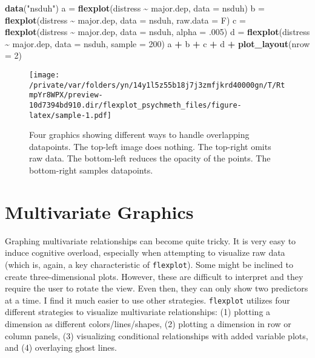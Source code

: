 \documentclass[
  english,
  man]{apa6}
\newenvironment{Shaded}{\begin{snugshade}}{\end{snugshade}}
\newcommand{\DataTypeTok}[1]{\textcolor[rgb]{0.13,0.29,0.53}{#1}}
\newcommand{\DecValTok}[1]{\textcolor[rgb]{0.00,0.00,0.81}{#1}}
\newcommand{\FloatTok}[1]{\textcolor[rgb]{0.00,0.00,0.81}{#1}}
\newcommand{\KeywordTok}[1]{\textcolor[rgb]{0.13,0.29,0.53}{\textbf{#1}}}
\newcommand{\NormalTok}[1]{#1}
\newcommand{\OperatorTok}[1]{\textcolor[rgb]{0.81,0.36,0.00}{\textbf{#1}}}
\newcommand{\StringTok}[1]{\textcolor[rgb]{0.31,0.60,0.02}{#1}}
\begin{document}
\small

\begin{Shaded}
\begin{Highlighting}[]
\KeywordTok{data}\NormalTok{(}\StringTok{"nsduh"}\NormalTok{)}
\NormalTok{a =}\StringTok{ }\KeywordTok{flexplot}\NormalTok{(distress }\OperatorTok{\textasciitilde{}}\StringTok{ }\NormalTok{major.dep, }\DataTypeTok{data =}\NormalTok{ nsduh)}
\NormalTok{b =}\StringTok{ }\KeywordTok{flexplot}\NormalTok{(distress }\OperatorTok{\textasciitilde{}}\StringTok{ }\NormalTok{major.dep, }\DataTypeTok{data =}\NormalTok{ nsduh, }\DataTypeTok{raw.data =}\NormalTok{ F)}
\NormalTok{c =}\StringTok{ }\KeywordTok{flexplot}\NormalTok{(distress }\OperatorTok{\textasciitilde{}}\StringTok{ }\NormalTok{major.dep, }\DataTypeTok{data =}\NormalTok{ nsduh, }\DataTypeTok{alpha =} \FloatTok{.005}\NormalTok{)}
\NormalTok{d =}\StringTok{ }\KeywordTok{flexplot}\NormalTok{(distress }\OperatorTok{\textasciitilde{}}\StringTok{ }\NormalTok{major.dep, }\DataTypeTok{data =}\NormalTok{ nsduh, }\DataTypeTok{sample =} \DecValTok{200}\NormalTok{)}
\NormalTok{a }\OperatorTok{+}\StringTok{ }\NormalTok{b }\OperatorTok{+}\StringTok{ }\NormalTok{c }\OperatorTok{+}\StringTok{ }\NormalTok{d }\OperatorTok{+}\StringTok{ }\KeywordTok{plot\_layout}\NormalTok{(}\DataTypeTok{nrow =} \DecValTok{2}\NormalTok{)}
\end{Highlighting}
\end{Shaded}

\begin{figure}
\centering
\texttt{[image: /private/var/folders/yn/14y1l5z55b18j7j3zmfjkrd40000gn/T/RtmpYr8WPX/preview-10d7394bd910.dir/flexplot\_psychmeth\_files/figure-latex/sample-1.pdf]}
\caption{\label{fig:sample}Four graphics showing different ways to handle overlapping datapoints. The top-left image does nothing. The top-right omits raw data. The bottom-left reduces the opacity of the points. The bottom-right samples datapoints. \label{fig:sample}}
\end{figure}

\normalsize

\hypertarget{multivariate-graphics}{%
\section{Multivariate Graphics}\label{multivariate-graphics}}

Graphing multivariate relationships can become quite tricky. It is very easy to induce cognitive overload, especially when attempting to visualize raw data (which is, again, a key characteristic of \texttt{flexplot}). Some might be inclined to create three-dimensional plots. However, these are difficult to interpret and they require the user to rotate the view. Even then, they can only show two predictors at a time. I find it much easier to use other strategies. \texttt{flexplot} utilizes four different strategies to visualize multivariate relationships: (1) plotting a dimension as different colors/lines/shapes, (2) plotting a dimension in row or column panels, (3) visualizing conditional relationships with added variable plots, and (4) overlaying ghost lines.
\end{document}
